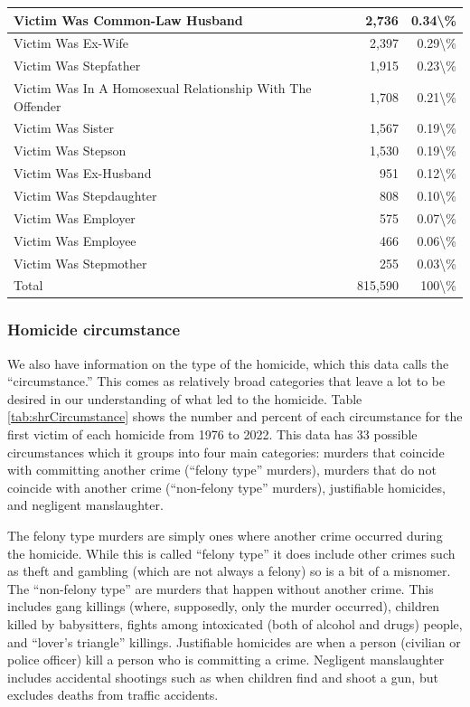 \documentclass[
]{krantz}
\begin{document}
\begin{longtable}[t]{l|l|r|r}
\hline
Victim Was Common-Law Husband &  & 2,736 & 0.34\textbackslash{}\%\\
\hline
Victim Was Ex-Wife &  & 2,397 & 0.29\textbackslash{}\%\\
\hline
Victim Was Stepfather &  & 1,915 & 0.23\textbackslash{}\%\\
\hline
Victim Was In A Homosexual Relationship With The Offender &  & 1,708 & 0.21\textbackslash{}\%\\
\hline
Victim Was Sister &  & 1,567 & 0.19\textbackslash{}\%\\
\hline
Victim Was Stepson &  & 1,530 & 0.19\textbackslash{}\%\\
\hline
Victim Was Ex-Husband &  & 951 & 0.12\textbackslash{}\%\\
\hline
Victim Was Stepdaughter &  & 808 & 0.10\textbackslash{}\%\\
\hline
Victim Was Employer &  & 575 & 0.07\textbackslash{}\%\\
\hline
Victim Was Employee &  & 466 & 0.06\textbackslash{}\%\\
\hline
Victim Was Stepmother &  & 255 & 0.03\textbackslash{}\%\\
\hline
Total &  & 815,590 & 100\textbackslash{}\%\\
\hline
\end{longtable}

\subsubsection{Homicide circumstance}\label{circumstance}

We also have information on the type of the homicide, which
this data calls the ``circumstance.'' This comes as
relatively broad categories that leave a lot to be desired
in our understanding of what led to the homicide. Table
\ref{tab:shrCircumstance} shows the number and percent of
each circumstance for the first victim of each homicide from
1976 to 2022. This data has 33 possible circumstances which
it groups into four main categories: murders that coincide
with committing another crime (``felony type'' murders),
murders that do not coincide with another crime
(``non-felony type'' murders), justifiable homicides, and
negligent manslaughter.

The felony type murders are simply ones where another crime
occurred during the homicide. While this is called ``felony
type'' it does include other crimes such as theft and
gambling (which are not always a felony) so is a bit of a
misnomer. The ``non-felony type'' are murders that happen
without another crime. This includes gang killings (where,
supposedly, only the murder occurred), children killed by
babysitters, fights among intoxicated (both of alcohol and
drugs) people, and ``lover's triangle'' killings.
Justifiable homicides are when a person (civilian or police
officer) kill a person who is committing a crime. Negligent
manslaughter includes accidental shootings such as when
children find and shoot a gun, but excludes deaths from
traffic accidents.
\end{document}
